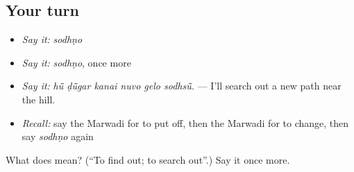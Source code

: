 \subsection*{Your turn}
\begin{itemize}
\raggedright
  \item \emph{Say it:} \emph{sodhṇo}
  \item \emph{Say it:} \emph{sodhṇo}, once more
  \item \emph{Say it:} \emph{hū̃ ḍū̃gar kanai nuvo gelo sodhsū̃.} — I'll search out a new path near the hill.
  \item \emph{Recall:} say the Marwadi for to put off, then the Marwadi for to change, then say \emph{sodhṇo} again
\end{itemize}

\begin{tcolorbox}[breakable,colback=teal!4,colframe=teal!35!black,title={Before you move on}]
What does  mean? (\textquotedblleft{}To find out; to search out\textquotedblright{}.) Say it once more.
\end{tcolorbox}
